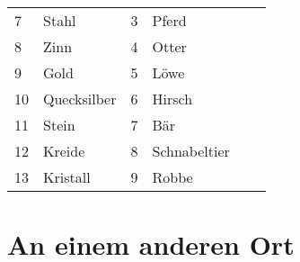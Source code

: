 \documentclass[final]{multiversum}
\begin{document}
\begin{table*}[!t]
\begin{framed}
\begin{tabular}{p{}p{}p{}p{}p{}p{}}
7             & Stahl                          & 3               & Pferd                                       \\
8             & Zinn                           & 4               & Otter                                       \\
9             & Gold                           & 5               & Löwe                                        \\
10            & Quecksilber                    & 6               & Hirsch                                      \\
11            & Stein                          & 7               & Bär                                         \\
12            & Kreide                         & 8               & Schnabeltier                                \\
13            & Kristall                       & 9               & Robbe                                       \\
\end{tabular}
\end{framed}
\end{table*}


\section{An einem anderen Ort}
\end{document}
